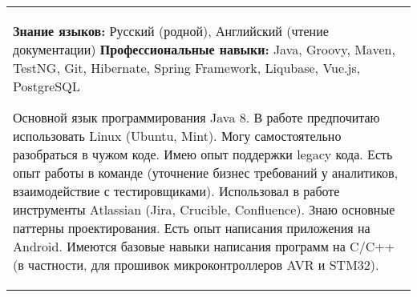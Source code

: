 \documentclass[11pt]{article}
\begin{document}
\begin{tabular}
{ L{18cm} }
\textbf{Знание языков:} Русский (родной), Английский (чтение документации)\newline
\textbf{Профессиональные навыки:} Java, Groovy, Maven, TestNG, Git, Hibernate, Spring Framework, Liqubase, Vue.js, PostgreSQL \medskip

Основной язык программирования Java 8. В работе предпочитаю использовать Linux (Ubuntu, Mint). Могу самостоятельно разобраться в чужом коде. Имею опыт поддержки legacy кода. Есть опыт работы в команде (уточнение бизнес требований у аналитиков, взаимодействие с тестировщиками). Использовал в работе инструменты Atlassian (Jira, Crucible, Confluence). Знаю основные паттерны проектирования. Есть опыт написания приложения на Android. Имеются базовые навыки написания программ на C/C++ (в частности, для прошивок микроконтроллеров AVR и STM32).

\end{tabular}
\end{document}
